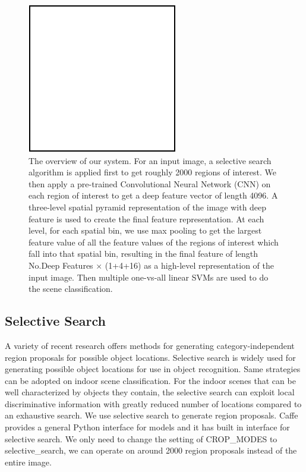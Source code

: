 \begin{figure}[ht]
  \centering
  \includegraphics[scale=0.8]{img/demo.pdf}
  \centering
  \caption{The overview of our system. For an input image, a selective search algorithm is applied first to get roughly 2000 regions of interest. We then apply a pre-trained Convolutional Neural Network (CNN) on each region of interest to get a deep feature vector of length 4096. A three-level spatial pyramid representation of the image with deep feature is used to create the final feature representation. At each level, for each spatial bin, we use max pooling to get the largest feature value of all the feature values of the regions of interest which fall into that spatial bin, resulting in the final feature of length No.Deep Features $\times$ (1+4+16) as a high-level representation of the input image. Then multiple one-vs-all linear SVMs are used to do the scene classification.}
  \label{fig:system_overview}
\end{figure}

\subsection{Selective Search}
A variety of recent research offers methods for generating category-independent
region proposals for possible object locations.
Selective search is widely used for generating possible object locations for
use in object recognition\cite{Uijlings:2013:SSO}. Same strategies can be
adopted on indoor scene classification. For the indoor scenes that can be well
characterized by objects they contain, the selective search can exploit local
discriminative information with greatly reduced number of locations compared
to an exhaustive search. We use selective search to generate region proposals.
Caffe provides a general Python interface for models and it has built in
interface for selective search. We only need to change the setting of CROP\_MODES
to selective\_search, we can operate on around 2000 region proposals instead of
the entire image.

